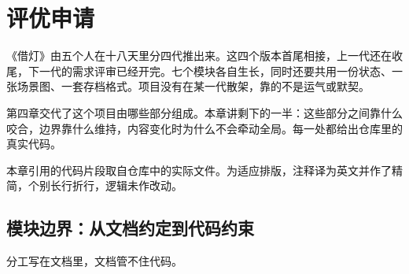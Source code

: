 %
%
%
%
%

\chapter{评优申请}

《借灯》由五个人在十八天里分四代推出来。这四个版本首尾相接，上一代还在收尾，下一代的需求评审已经开完。七个模块各自生长，同时还要共用一份状态、一张场景图、一套存档格式。项目没有在某一代散架，靠的不是运气或默契。

第四章交代了这个项目由哪些部分组成。本章讲剩下的一半：这些部分之间靠什么咬合，边界靠什么维持，内容变化时为什么不会牵动全局。每一处都给出仓库里的真实代码。

本章引用的代码片段取自仓库中的实际文件。为适应排版，注释译为英文并作了精简，个别长行折行，逻辑未作改动。


\section{模块边界：从文档约定到代码约束}

分工写在文档里，文档管不住代码。

